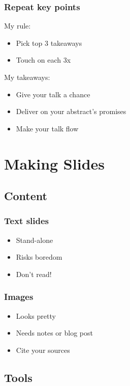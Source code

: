 \documentclass{beamer}
\begin{document}
\begin{frame}[fragile]
\frametitle{Repeat key points}
My rule:
\begin{itemize}
\item Pick top 3 takeaways
\item Touch on each 3x
\end{itemize}
My takeaways:
\begin{itemize}[<+(1)->]
\item Give your talk a chance
\item Deliver on your abstract's promises
\item Make your talk flow
\end{itemize}
\end{frame}

\section{Making Slides}

\begin{frame}[fragile]
\tableofcontents[currentsection]
\end{frame}

\subsection{Content}

\begin{frame}[fragile]
\frametitle{Text slides}
\begin{itemize}[<+(1)->]
\item Stand-alone
\item Risks boredom
\item Don't read!
\end{itemize}
\end{frame}

\begin{frame}[fragile]
\frametitle{Images}
\begin{itemize}[<+(1)->]
\item Looks pretty
\item Needs notes or blog post
\item Cite your sources
\end{itemize}
\end{frame}

\subsection{Tools}
\end{document}
